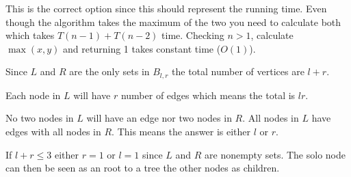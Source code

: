 \documentclass[a4paper]{article}
\newenvironment{task}[1]
{
	\begin{description}[align=right]
		\item [#1]
}{		%
	\end{description}
}
\DeclareMathOperator{\*}{\cdot}
\begin{document}
\begin{task}{(b)}
\end{task}

\begin{task}{4. (a)}
	 This is the correct option since this should represent the running time. Even though the algorithm takes the maximum of the two you need to calculate both which takes $T(n-1)+T(n-2)$ time. Checking $n > 1$, calculate $\max(x,y)$ and returning 1 takes constant time ($O(1)$).
\end{task}

\begin{task}{5. (a)}
	 Since $L$ and $R$ are the only sets in $B_{l,r}$ the total number of vertices are $l+r$.
\end{task}

\begin{task}{(b)}
	 Each node in $L$ will have $r$ number of edges which means the total is $lr$.
\end{task}

\begin{task}{(c)}
	 No two nodes in $L$ will have an edge nor two nodes in $R$. All nodes in $L$ have edges with all nodes in $R$. This means the answer is either $l$ or $r$.
\end{task}

\begin{task}{(d)}
	 If $l+r\leq 3$ either $r=1$ or $l=1$ since $L$ and $R$ are nonempty sets. The solo node can then be seen as an root to a tree the other nodes as children.
\end{task}
\end{document}
